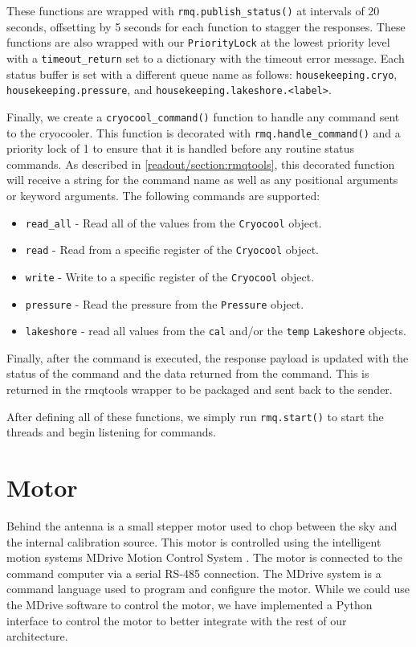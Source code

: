 These functions are wrapped with \texttt{rmq.publish\_status()} at intervals of 20 seconds, offsetting by 5 seconds for each function to stagger the responses. 
These functions are also wrapped with our \texttt{PriorityLock} at the lowest priority level with a \texttt{timeout\_return} set to a dictionary with the timeout error message.
Each status buffer is set with a different queue name as follows: \texttt{housekeeping.cryo}, \texttt{housekeeping.pressure}, and \texttt{housekeeping.lakeshore.<label>}.

Finally, we create a \texttt{cryocool\_command()} function to handle any command sent to the cryocooler.
This function is decorated with \texttt{rmq.handle\_command()} and a priority lock of 1 to ensure that it is handled before any routine status commands.
As described in \ref{readout/section:rmqtools}, this decorated function will receive a string for the command name as well as any positional arguments or keyword arguments.
The following commands are supported:

\begin{itemize}
    \item \texttt{read\_all} - Read all of the values from the \texttt{Cryocool} object. 
    \item \texttt{read} - Read from a specific register of the \texttt{Cryocool} object.
    \item \texttt{write} - Write to a specific register of the \texttt{Cryocool} object.
    \item \texttt{pressure} - Read the pressure from the \texttt{Pressure} object.
    \item \texttt{lakeshore} - read all values from the \texttt{cal} and/or the \texttt{temp} \texttt{Lakeshore} objects.
\end{itemize}

Finally, after the command is executed, the response payload is updated with the status of the command and the data returned from the command.
This is returned in the rmqtools wrapper to be packaged and sent back to the sender.

After defining all of these functions, we simply run \texttt{rmq.start()} to start the threads and begin listening for commands.

\section{Motor}
Behind the antenna is a small stepper motor used to chop between the sky and the internal calibration source.
This motor is controlled using the intelligent motion systems MDrive Motion Control System \parencite{mdrive}.
The motor is connected to the command computer via a serial RS-485 connection. 
The MDrive system is a command language used to program and configure the motor.
While we could use the MDrive software to control the motor, we have implemented a Python interface to control the motor to better integrate with the rest of our architecture. 

